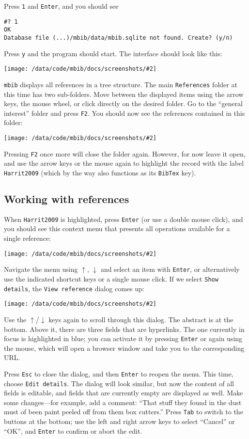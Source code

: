 \documentclass[10pt]{article}
\newcommand*{\mbib}{\texttt{mbib}\xspace}
\newcommand*{\bibtex}{\texttt{BibTex}\xspace}
\newcommand*{\key}[1]{\texttt{#1}\xspace}
\newcommand*{\arrowdown}{\key{$\downarrow$}}
\newcommand*{\arrowup}{\key{$\uparrow$}}
\newcommand{\screenshot}[2][]{%
\medskip\par
\begin{center}
\texttt{[image: /data/code/mbib/docs/screenshots/\#2]}
\end{center}}
\begin{document}
\noindent Press \key{1} and \key{Enter}, and you should see

\begin{verbatim}
#? 1
OK
Database file (...)/mbib/data/mbib.sqlite not found. Create? (y/n) 
\end{verbatim}

\noindent Press \key{y} and the program should start. The interface should look like this:

\screenshot{initial-screen}

\noindent \mbib displays all references in a tree structure. The main \texttt{References} folder at this time has two sub-folders. Move between the displayed items using the arrow keys, the mouse wheel, or click directly on the desired folder. Go to the ``general interest'' folder and press \key{F2}. You should now see the references contained in this folder:

\screenshot{f2-pressed}

\noindent Pressing \key{F2} once more will close the folder again. However, for now leave it open, and use the arrow keys or the mouse again to highlight the record with the label  \texttt{Harrit2009} (which by the way also functions as its \bibtex key). 

\subsection{Working with references}

When \texttt{Harrit2009} is highlighted, press \key{Enter} (or use a double mouse click), and you should see this context menu that presents all operations available for a single reference:

\screenshot{reference-menu}

\noindent Navigate the menu using \arrowup, \arrowdown and select an item with \key{Enter}, or alternatively use the indicated shortcut keys or a single mouse click. If we select \texttt{Show details}, the \texttt{View reference} dialog comes up:

\screenshot{refview}

\noindent Use the \arrowup/\arrowdown keys again to scroll through this dialog.  The abstract is at the bottom. Above it, there are three fields that are hyperlinks. The one currently in focus is highlighted in blue; you can activate it by pressing \key{Enter} or again using the mouse, which will open a browser window and take you to the corresponding URL. 

Press \texttt{Esc} to close the dialog, and then \key{Enter} to reopen the menu. This time, choose \texttt{Edit details}. The dialog will look similar, but now the content of all fields is editable, and fields that are currently empty are displayed as well. Make some changes---for example, add a comment: ``That stuff they found in the dust must of been paint peeled off from them box cutters.'' Press \texttt{Tab} to switch to the buttons at the bottom; use the left and right arrow keys to select ``Cancel'' or ``OK'', and \key{Enter} to confirm or abort the edit.  
\end{document}
